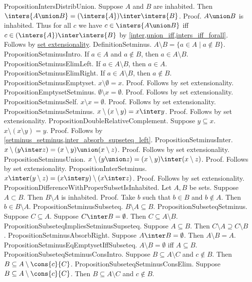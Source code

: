 PropositionIntersDistribUnion. Suppose $A$ and $B$ are inhabited. Then $ \inters{A \union B} = ( \inters{A}) \inter \inters{B}$.
Proof. $A \union B$ is inhabited. Thus for all $c$ we have $c \in \inters{A \union B}$ iff $c \in( \inters{A}) \inter \inters{B}$ by \cref{inter,union_iff,inters_iff_forall}. Follows by \hyperref[setext]{set extensionality}. %
DefinitionSetminus. $A \setminus B = \{ a \in A \mid a \not \in B \}$.
PropositionSetminusIntro. If $a \in A$ and $a \notin B$, then $a \in A \setminus B$.
PropositionSetminusElimLeft. If $a \in A \setminus B$, then $a \in A$.
PropositionSetminusElimRight. If $a \in A \setminus B$, then $a \notin B$.
PropositionSetminusEmptyset. $x \setminus \emptyset = x$.
Proof. Follows by set extensionality.
PropositionEmptysetSetminus. $ \emptyset \setminus x = \emptyset$.
Proof. Follows by set extensionality.
PropositionSetminusSelf. $x \setminus x = \emptyset$.
Proof. Follows by set extensionality.
PropositionSetminusSetminus. $x \setminus (x \setminus y) = x \inter y$.
Proof. Follows by set extensionality.
PropositionDoubleRelativeComplement. Suppose $y \subseteq x$. $x \setminus (x \setminus y) = y$.
Proof. Follows by \cref{setminus_setminus,inter_absorb_supseteq_left}.
PropositionSetminusInter. $x \setminus (y \inter z) = (x \setminus y) \union (x \setminus z)$.
Proof. Follows by set extensionality.
PropositionSetminusUnion. $x \setminus (y \union z) = (x \setminus y) \inter (x \setminus z)$.
Proof. Follows by set extensionality.
PropositionInterSetminus. $x \inter (y \setminus z) = (x \inter y) \setminus (x \inter z)$.
Proof. Follows by set extensionality.
PropositionDifferenceWithProperSubsetIsInhabited. Let $A, B$ be sets. Suppose $A \subset B$. Then $B \setminus A$ is inhabited.
Proof. Take $b$ such that $b \in B$ and $b \notin A$. Then $b \in B \setminus A$.
PropositionSetminusSubseteq. $B \setminus A \subseteq B$.
PropositionSubseteqSetminus. Suppose $C \subseteq A$. Suppose $C \inter B = \emptyset$. Then $C \subseteq A \setminus B$.
PropositionSubseteqImpliesSetminusSupseteq. Suppose $A \subseteq B$. Then $C \setminus A \supseteq C \setminus B$.
PropositionSetminusAbsorbRight. Suppose $A \inter B = \emptyset$. Then $A \setminus B = A$.
PropositionSetminusEqEmptysetIffSubseteq. $A \setminus B = \emptyset$ iff $A \subseteq B$.
PropositionSubseteqSetminusConsIntro. Suppose $B \subseteq A \setminus C$ and $c \notin B$. Then $B \subseteq A \setminus \cons{c}{C}$.
PropositionSubseteqSetminusConsElim. Suppose $B \subseteq A \setminus \cons{c}{C}$. Then $B \subseteq A \setminus C$ and $c \notin B$.
